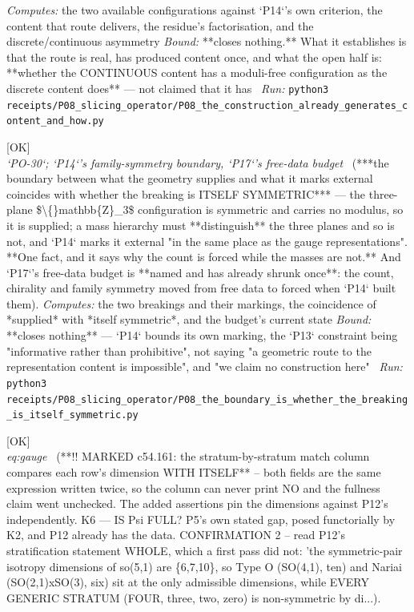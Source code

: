 \begin{description}
\emph{Computes:} the two available configurations against `P14`'s own criterion, the content that route delivers, the residue's factorisation, and the discrete/continuous asymmetry
 \emph{Bound:}  **closes nothing.** What it establishes is that the route is real, has produced content once, and what the open half is: **whether the CONTINUOUS content has a moduli-free configuration as the discrete content does** --- not claimed that it has
\ \emph{Run:} \texttt{python3 receipts/P08\_slicing\_operator/P08\_the\_construction\_already\_generates\_content\_and\_how.py}
\item[\rcptlabel{P08_the_boundary_is_whether_the_breaking_is_itself_symmetric}{P8R13}\textbf{P8R13}\quad\texttt{P08\_the\_boundary\_is\_whether\_the\_breaking\_is\_itself\_symmetric}]\hfill\textsf{[OK]}\\
\textit{`PO-30`; `P14`'s family-symmetry boundary, `P17`'s free-data budget} \ (***the boundary between what the geometry supplies and what it marks external coincides with whether the breaking is ITSELF SYMMETRIC*** --- the three-plane \$\textbackslash\{\}mathbb\{Z\}\_3\$ configuration is symmetric and carries no modulus, so it is supplied; a mass hierarchy must **distinguish** the three planes and so is not, and `P14` marks it external "in the same place as the gauge representations". **One fact, and it says why the count is forced while the masses are not.**  And `P17`'s free-data budget is **named and has already shrunk once**: the count, chirality and family symmetry moved from free data to forced when `P14` built them). 
\emph{Computes:} the two breakings and their markings, the coincidence of *supplied* with *itself symmetric*, and the budget's current state
 \emph{Bound:}  **closes nothing** --- `P14` bounds its own marking, the `P13` constraint being "informative rather than prohibitive", not saying "a geometric route to the representation content is impossible", and "we claim no construction here"
\ \emph{Run:} \texttt{python3 receipts/P08\_slicing\_operator/P08\_the\_boundary\_is\_whether\_the\_breaking\_is\_itself\_symmetric.py}
\item[\rcptlabel{K6_fullness}{P8R14}\textbf{P8R14}\quad\texttt{K6\_fullness}]\hfill\textsf{[OK]}\\
\textit{eq:gauge} \ (**!! MARKED c54.161: the stratum-by-stratum match column compares each row's dimension WITH ITSELF** -- both fields are the same expression written twice, so the column can never print NO and the fullness claim went unchecked. The added assertions pin the dimensions against P12's independently. K6 --- IS Psi FULL? P5's own stated gap, posed functorially by K2, and P12 already has the data. CONFIRMATION 2 -- read P12's stratification statement WHOLE, which a first pass did not: 'the symmetric-pair isotropy dimensions of so(5,1) are \{6,7,10\}, so Type O (SO(4,1), ten) and Nariai (SO(2,1)xSO(3), six) sit at the only admissible dimensions, while EVERY GENERIC STRATUM (FOUR, three, two, zero) is non-symmetric by di...). 

\end{description}
